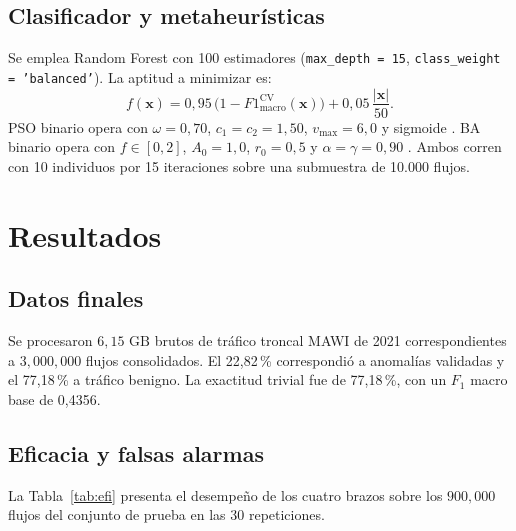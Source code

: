 \documentclass[11pt,a4paper]{article}
\begin{document}
\subsection{Clasificador y metaheurísticas}
Se emplea Random Forest \parencite{breiman2001} con 100 estimadores (\texttt{max\_depth = 15}, \texttt{class\_weight = 'balanced'}). La aptitud a minimizar es:
\begin{equation}
f(\mathbf{x}) = 0{,}95\,\bigl(1 - F1_{\text{macro}}^{\text{CV}}(\mathbf{x})\bigr) + 0{,}05\,\frac{|\mathbf{x}|}{50}.
\label{eq:fitness}
\end{equation}
PSO binario opera con $\omega = 0{,}70$, $c_1 = c_2 = 1{,}50$, $v_{\max} = 6{,}0$ y sigmoide \parencite{kennedy1995}. BA binario opera con $f \in [0, 2]$, $A_0 = 1{,}0$, $r_0 = 0{,}5$ y $\alpha = \gamma = 0{,}90$ \parencite{yang2010}. Ambos corren con 10 individuos por 15 iteraciones sobre una submuestra de 10.000 flujos.

\section{Resultados}

\subsection{Datos finales}
Se procesaron $6{,}15\text{ GB}$ brutos de tráfico troncal MAWI de 2021 correspondientes a $3{,}000{,}000$ flujos consolidados. El 22,82\,\% correspondió a anomalías validadas y el 77,18\,\% a tráfico benigno. La exactitud trivial fue de 77,18\,\%, con un $F_1$ macro base de 0,4356.

\subsection{Eficacia y falsas alarmas}
La Tabla~\ref{tab:efi} presenta el desempeño de los cuatro brazos sobre los $900{,}000$ flujos del conjunto de prueba en las 30 repeticiones.
\end{document}
